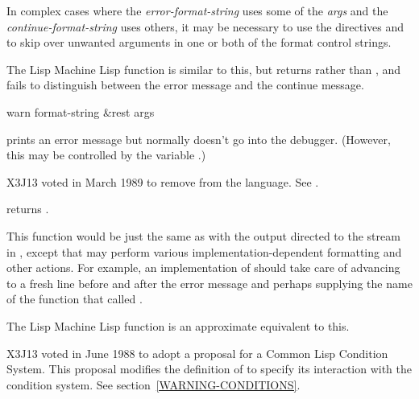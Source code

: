 \begin{defun}[Function]
In complex cases where the \emph{error-format-string}
uses some of the \emph{args} and the
\emph{continue-format-string} uses others, it may be necessary to use the
 directives \cd{{\Xtilde}*} and \cd{{\Xtilde}{\Xatsign}*}
to skip over unwanted arguments in one or both of the
format control strings.

\beforenoterule
\begin{incompatibility}
The Lisp Machine Lisp function  is similar to this, but
returns 
rather than {\false}, and fails to distinguish between the error message
and the continue message.
\end{incompatibility}
\afternoterule
\end{defun}

\begin{defun}[Function]
warn format-string &rest args

\begin{obsolete}
\noindent
{} prints an error message but normally
doesn't go into the debugger.  (However, this may be controlled
by the variable .)
\end{obsolete}
\begin{newer}
X3J13 voted in March 1989
to remove  from the language.
See .
\end{newer}
\begin{obsolete}
 returns {\false}.

This function would be just the same as
 with the output directed 
to the stream in , except that 
may perform various implementation-dependent formatting and
other actions.  For example, an implementation of  should take
care of advancing to a fresh line before and after the error message
and perhaps supplying the name of the function that called .
\end{obsolete}

\beforenoterule
\begin{incompatibility}
The Lisp Machine Lisp function  is an
approximate equivalent to this.
\end{incompatibility}
\afternoterule

\begin{new}
X3J13 voted in June 1988
to adopt a proposal for a Common Lisp Condition System. 
This proposal modifies the definition of  to specify its interaction
with the condition system.  See section~\ref{WARNING-CONDITIONS}.
\end{new}
\end{defun}

